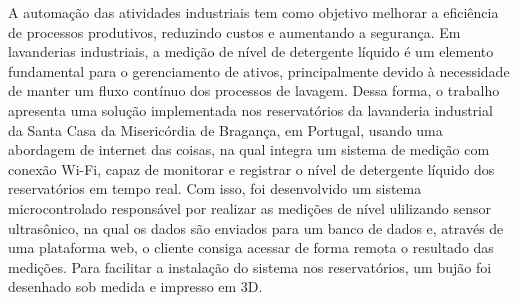
A automação das atividades industriais tem como objetivo melhorar a eficiência de processos produtivos, reduzindo custos e aumentando a segurança. Em lavanderias industriais, a medição de nível de detergente líquido é um elemento fundamental para o gerenciamento de ativos, principalmente devido à necessidade de manter um fluxo contínuo dos processos de lavagem. Dessa forma, o trabalho apresenta uma solução implementada nos reservatórios da lavanderia industrial da Santa Casa da Misericórdia de Bragança, em Portugal, usando uma abordagem de internet das coisas, na qual integra um sistema de medição com conexão Wi-Fi, capaz de monitorar e registrar o nível de detergente líquido dos reservatórios em tempo real. Com isso, foi desenvolvido um sistema microcontrolado responsável por realizar as medições de nível ulilizando sensor ultrasônico, na qual os dados são enviados para um banco de dados e, através de uma plataforma web, o cliente consiga acessar de forma remota o resultado das medições. Para facilitar a instalação do sistema nos reservatórios, um bujão foi desenhado sob medida e impresso em 3D.

\bigskip

